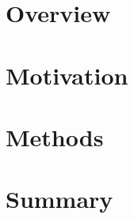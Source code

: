 \documentclass[../main.tex]{subfiles}
\begin{document}
\section{Overview}

\section{Motivation}

\section{Methods}

\section{Summary}
\end{document}
